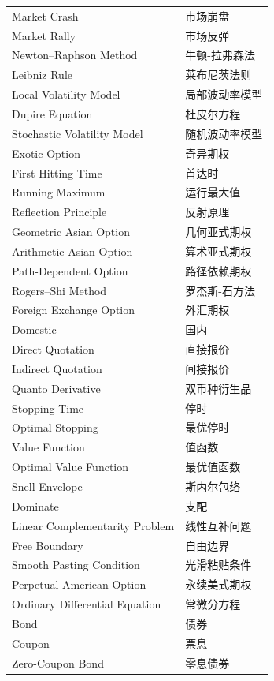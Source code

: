 \begin{longtable}{ll}
    Market Crash & 市场崩盘 \\
    Market Rally & 市场反弹 \\
    Newton--Raphson Method & 牛顿-拉弗森法 \\
    Leibniz Rule & 莱布尼茨法则 \\
    Local Volatility Model & 局部波动率模型 \\
    Dupire Equation & 杜皮尔方程 \\
    Stochastic Volatility Model & 随机波动率模型 \\
    Exotic Option & 奇异期权 \\
    First Hitting Time & 首达时 \\
    Running Maximum & 运行最大值 \\
    Reflection Principle & 反射原理 \\
    Geometric Asian Option & 几何亚式期权 \\
    Arithmetic Asian Option & 算术亚式期权 \\
    Path-Dependent Option & 路径依赖期权 \\
    Rogers--Shi Method & 罗杰斯-石方法 \\
    Foreign Exchange Option & 外汇期权 \\
    Domestic & 国内 \\
    Direct Quotation & 直接报价 \\
    Indirect Quotation & 间接报价 \\
    Quanto Derivative & 双币种衍生品 \\
    Stopping Time & 停时 \\
    Optimal Stopping & 最优停时 \\
    Value Function & 值函数 \\
    Optimal Value Function & 最优值函数 \\
    Snell Envelope & 斯内尔包络 \\
    Dominate & 支配 \\
    Linear Complementarity Problem & 线性互补问题 \\
    Free Boundary & 自由边界 \\
    Smooth Pasting Condition & 光滑粘贴条件 \\
    Perpetual American Option & 永续美式期权 \\
    Ordinary Differential Equation & 常微分方程 \\
    Bond & 债券 \\
    Coupon & 票息 \\
    Zero-Coupon Bond & 零息债券 \\

\end{longtable}
